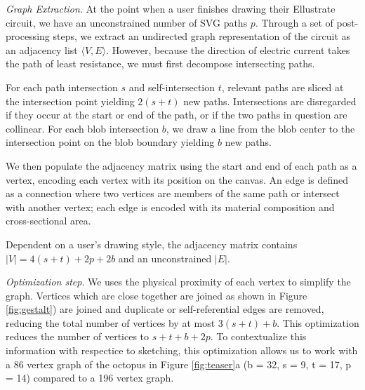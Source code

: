 \documentclass{sigchi}
\begin{document}
      \textit{Graph Extraction}.
      At the point when a user finishes drawing their Ellustrate circuit, we have an unconstrained number of SVG paths $p$. 
      Through a set of post-processing steps, we extract an undirected graph representation of the circuit as an adjacency list $\langle V, E \rangle$. However, because the direction of electric current takes the path of least resistance, we must first decompose intersecting paths.
      
    For each path intersection $s$ and self-intersection $t$, relevant paths are sliced at the intersection point yielding $2(s + t)$ new paths. Intersections are disregarded if they occur at the start or end of the path, or if the two paths in question are collinear. For each blob intersection $b$, we draw a line from the blob center to the intersection point on the blob boundary yielding $b$ new paths. 
    
     We then populate the adjacency matrix using the start and end of each path as a vertex, encoding each vertex with its position on the canvas. An edge is defined as a connection where two vertices are members of the same path or intersect with another vertex; each edge is encoded with its material composition and cross-sectional area.
     
     Dependent on  a user's drawing style, the adjacency matrix contains $|V| = 4(s + t) + 2p + 2b $ and an unconstrained $|E|$.
 
   

    \textit{Optimization step}. We uses the physical proximity of each vertex to simplify the graph. Vertices which are close together are joined as shown in Figure \ref{fig:gestalt}) are joined and duplicate or self-referential edges are removed, reducing the total number of vertices by at most $3(s + t) + b$. This optimization reduces the number of vertices to $s + t + b + 2p$. To contextualize this information with respectice to sketching, this optimization allows us to work with a 86 vertex graph of the octopus in Figure \ref{fig:teaser}a (b = 32, s = 9, t = 17, p = 14) compared to a 196 vertex graph.
\end{document}
